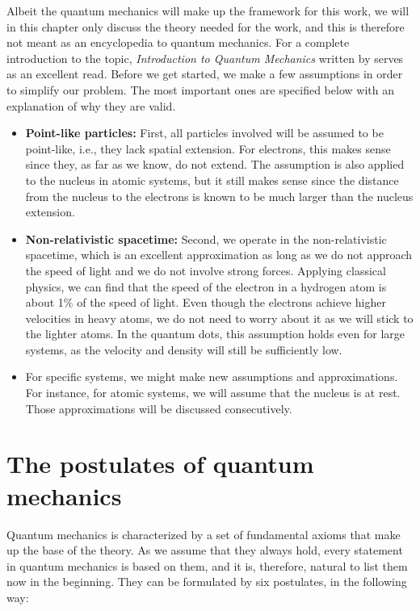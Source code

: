Albeit the quantum mechanics will make up the framework for this work, we will in this chapter only discuss the theory needed for the work, and this is therefore not meant as an encyclopedia to quantum mechanics. For a complete introduction to the topic, \textit{Introduction to Quantum Mechanics} written by \citet{griffiths_introduction_2005} serves as an excellent read. Before we get started, we make a few assumptions in order to simplify our problem. The most important ones are specified below with an explanation of why they are valid.

\begin{itemize}
	\item \textbf{Point-like particles:} First, all particles involved will be assumed to be point-like, i.e., they lack spatial extension. For electrons, this makes sense since they, as far as we know, do not extend. The assumption is also applied to the nucleus in atomic systems, but it still makes sense since the distance from the nucleus to the electrons is known to be much larger than the nucleus extension.
	
	\item \textbf{Non-relativistic spacetime:}  Second, we operate in the non-relativistic spacetime, which is an excellent approximation as long as we do not approach the speed of light and we do not involve strong forces. Applying classical physics, we can find that the speed of the electron in a hydrogen atom is about 1\% of the speed of light. Even though the electrons achieve higher velocities in heavy atoms, we do not need to worry about it as we will stick to the lighter atoms. In the quantum dots, this assumption holds even for large systems, as the velocity and density will still be sufficiently low.
	
	\item For specific systems, we might make new assumptions and approximations. For instance, for atomic systems, we will assume that the nucleus is at rest. Those approximations will be discussed consecutively. 
\end{itemize}

\section{The postulates of quantum mechanics} \label{sec:postulates}
Quantum mechanics is characterized by a set of fundamental axioms that make up the base of the theory. As we assume that they always hold, every statement in quantum mechanics is based on them, and it is, therefore, natural to list them now in the beginning. They can be formulated by six postulates, in the following way:

